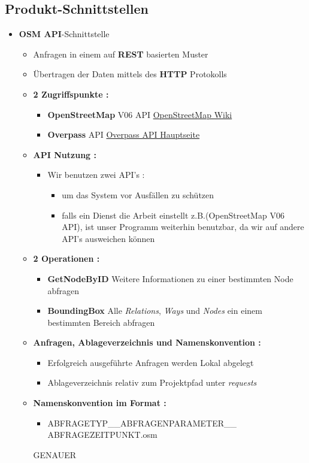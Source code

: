 	\subsection{Produkt-Schnittstellen}
	\begin{itemize}
		\item \textbf{OSM API}-Schnittstelle
		\begin{itemize}
			\item Anfragen in einem auf \textbf{REST} basierten Muster
			\item Übertragen der Daten mittels des \textbf{HTTP} Protokolls
			\item \textbf{2 Zugriffspunkte :}
			\begin{itemize}
				\item \textbf{OpenStreetMap} V06 API \href{http://wiki.openstreetmap.org/wiki/API_v0.6}{OpenStreetMap Wiki}
				\item \textbf{Overpass} API \href{http://overpass-api.de/}{Overpass API Hauptseite}
			\end{itemize}
			\item \textbf{API Nutzung :}
			\begin{itemize}
				\item Wir benutzen zwei API's :
				\begin{itemize}
					\item um das System vor Ausfällen zu schützen
					\item falls ein Dienst die Arbeit einstellt z.B.(OpenStreetMap V06 API), ist unser Programm weiterhin benutzbar, da wir auf andere API's ausweichen können
				\end{itemize}  
			\end{itemize}
			\item \textbf{2 Operationen :}
			\begin{itemize}
				\item \textbf{GetNodeByID} Weitere Informationen zu einer bestimmten Node abfragen
				\item \textbf{BoundingBox} Alle \textit{Relations}, \textit{Ways} und \textit{Nodes} ein einem
					bestimmten Bereich abfragen
			\end{itemize}
			\item \textbf{Anfragen, Ablageverzeichnis und Namenskonvention :}			
			\begin{itemize}
				\item Erfolgreich ausgeführte Anfragen werden Lokal abgelegt
				\item Ablageverzeichnis relativ zum Projektpfad unter \textit{requests}
			\end{itemize}
				\item \textbf{Namenskonvention im Format :}
				\begin{itemize}
				\item ABFRAGETYP\_\_ABFRAGENPARAMETER\_\_\\ABFRAGEZEITPUNKT.osm
				\end{itemize}		
				GENAUER					
		\end{itemize}
	\end{itemize}
	
